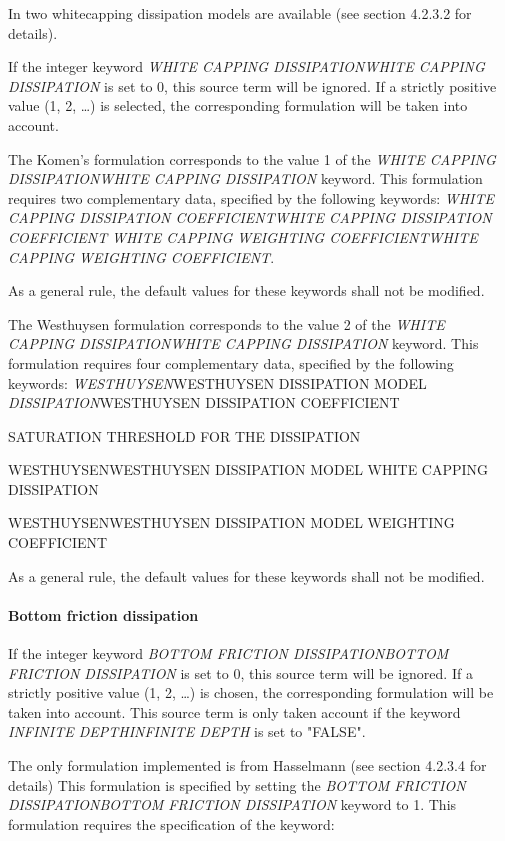  In \tomawac two whitecapping dissipation models are available (see section 4.2.3.2 for details).

 If the integer keyword \textit{WHITE CAPPING DISSIPATIONWHITE CAPPING DISSIPATION }is set to 0, this source term will be ignored. If a strictly positive value (1, 2, \dots ) is selected, the corresponding formulation will be taken into account.

 The Komen's formulation corresponds to the value 1 of the \textit{WHITE CAPPING DISSIPATIONWHITE CAPPING DISSIPATION} keyword. This formulation requires two complementary data, specified by the following keywords:   \textit{WHITE CAPPING DISSIPATION COEFFICIENTWHITE CAPPING DISSIPATION COEFFICIENT}   \textit{WHITE CAPPING WEIGHTING COEFFICIENTWHITE CAPPING WEIGHTING COEFFICIENT}.

 As a general rule, the default values for these keywords shall not be modified.



 The Westhuysen formulation corresponds to the value 2 of the \textit{WHITE CAPPING DISSIPATIONWHITE CAPPING DISSIPATION} keyword. This formulation requires four complementary data, specified by the following keywords:   \textit{WESTHUYSEN}WESTHUYSEN DISSIPATION MODEL\textit{ DISSIPATION}WESTHUYSEN DISSIPATION COEFFICIENT

 SATURATION THRESHOLD FOR THE DISSIPATION

 WESTHUYSENWESTHUYSEN DISSIPATION MODEL WHITE CAPPING DISSIPATION

 WESTHUYSENWESTHUYSEN DISSIPATION MODEL WEIGHTING COEFFICIENT

 As a general rule, the default values for these keywords shall not be modified.




\paragraph{ Bottom friction dissipation}

 If the integer keyword \textit{BOTTOM FRICTION DISSIPATIONBOTTOM FRICTION DISSIPATION} is set to 0, this source term will be ignored. If a strictly positive value (1, 2, \dots ) is chosen, the corresponding formulation will be taken into account. This source term is only taken account if the keyword \textit{INFINITE DEPTHINFINITE DEPTH} is set to "FALSE".

 The only formulation implemented is from Hasselmann (see section 4.2.3.4 for details) This formulation is specified by setting the \textit{BOTTOM FRICTION DISSIPATIONBOTTOM FRICTION DISSIPATION} keyword to 1. This formulation requires the specification of the keyword:

